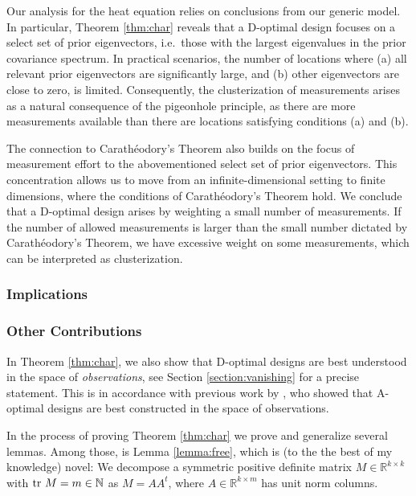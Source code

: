 \begin{enumerate}
  Our analysis for the heat equation relies on conclusions from our
  generic model. In particular, Theorem \ref{thm:char} reveals that a
  D-optimal design focuses on a select set of prior eigenvectors,
  i.e.~those with the largest eigenvalues in the prior covariance
  spectrum. In practical scenarios, the number of locations where (a)
  all relevant prior eigenvectors are significantly large, and (b)
  other eigenvectors are close to zero, is limited. Consequently, the
  clusterization of measurements arises as a natural consequence of
  the pigeonhole principle, as there are more measurements available
  than there are locations satisfying conditions (a) and (b).

  The connection to Carath\'eodory's Theorem also builds on the focus
  of measurement effort to the abovementioned select set of prior
  eigenvectors. This concentration allows us to move from an
  infinite-dimensional setting to finite dimensions, where the
  conditions of Carath\'eodory's Theorem hold. We conclude that a
  D-optimal design arises by weighting a small number of
  measurements. If the number of allowed measurements is larger than
  the small number dictated by Carath\'eodory's Theorem, we have
  excessive weight on some measurements, which can be interpreted as
  clusterization.
  
\end{enumerate}

\subsubsection{Implications}



\subsubsection{Other Contributions}
In Theorem \ref{thm:char}, we also show that D-optimal designs are
best understood in the space of \emph{observations}, see Section
\ref{section:vanishing} for a precise statement. This is in accordance
with previous work by \cite{koval2020}, who showed that A-optimal
designs are best constructed in the space of observations.

In the process of proving Theorem \ref{thm:char} we prove and
generalize several lemmas. Among those, is Lemma \ref{lemma:free},
which is (to the the best of my knowledge) novel: We decompose a
symmetric positive definite matrix \(M \in \mathbb{R}^{k \times k}\)
with \(\textup{tr}\ M = m \in \mathbb{N}\) as \(M = AA^t\), where \(A\in
\mathbb{R}^{k \times m}\) has unit norm columns.


